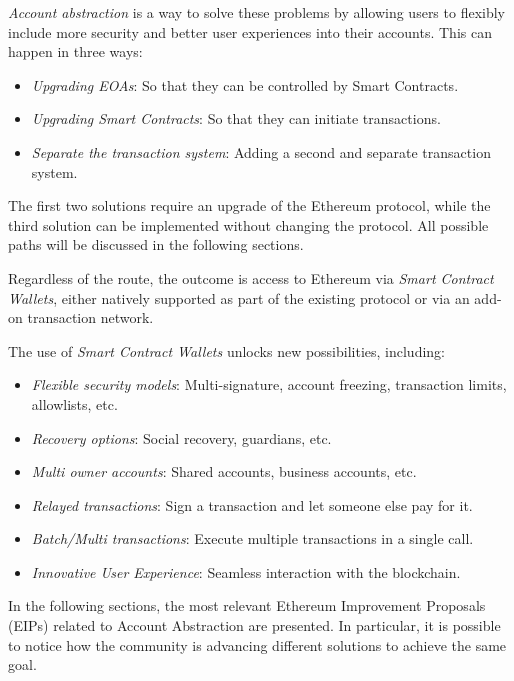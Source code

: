 \textit{Account abstraction} is a way to solve these problems by allowing users to flexibly include more security and better user experiences into their accounts. This can happen in three ways: \cite{ethereum-account-abstraction}
\begin{itemize}
    \item \textit{Upgrading EOAs}: So that they can be controlled by Smart Contracts.
    \item \textit{Upgrading Smart Contracts}: So that they can initiate transactions. 
    \item \textit{Separate the transaction system}: Adding a second and separate transaction system.
\end{itemize}

The first two solutions require an upgrade of the Ethereum protocol, while the third solution can be implemented without changing the protocol.\cite{ethereum-account-abstraction} All possible paths will be discussed in the following sections.

Regardless of the route, the outcome is access to Ethereum via \textit{Smart Contract Wallets}, either natively supported as part of the existing protocol or via an add-on transaction network.  \cite{ethereum-account-abstraction}

The use of \textit{Smart Contract Wallets}  unlocks new possibilities, including: \cite{ethereum-account-abstraction}
\begin{itemize}
    \item \textit{Flexible security models}: Multi-signature, account freezing, transaction limits, allowlists, etc.
    \item \textit{Recovery options}: Social recovery, guardians, etc.
    \item \textit{Multi owner accounts}: Shared accounts, business accounts, etc.
    \item \textit{Relayed transactions}: Sign a transaction and let someone else pay for it.
    \item \textit{Batch/Multi transactions}: Execute multiple transactions in a single call.
    \item \textit{Innovative User Experience}: Seamless interaction with the blockchain.
\end{itemize}


In the following sections, the most relevant Ethereum Improvement Proposals (EIPs) related to Account Abstraction are presented. In particular, it is possible to notice how the community is advancing different solutions to achieve the same goal. %


